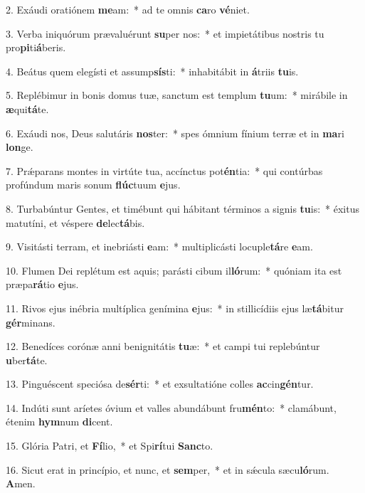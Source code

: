 2. Exáudi oratiónem \textbf{me}am:~*  ad te omnis \textbf{ca}ro \textbf{vé}niet.\

3. Verba iniquórum prævaluérunt \textbf{su}per nos:~*  et impietátibus nostris tu pro\textbf{pi}ti\textbf{á}beris.\

4. Beátus quem elegísti et assump\textbf{sís}ti:~*  inhabitábit in \textbf{á}triis \textbf{tu}is.\

5. Replébimur in bonis domus tuæ, sanctum est templum \textbf{tu}um:~*  mirábile in \textbf{æ}qui\textbf{tá}te.\

6. Exáudi nos, Deus salutáris \textbf{nos}ter:~*  spes ómnium fínium terræ et in \textbf{ma}ri \textbf{lon}ge.\

7. Prǽparans montes in virtúte tua, accínctus pot\textbf{én}tia:~*  qui contúrbas profúndum maris sonum \textbf{flúc}tuum \textbf{e}jus.\

8. Turbabúntur Gentes, et timébunt qui hábitant términos a signis \textbf{tu}is:~*  éxitus matutíni, et véspere \textbf{de}lec\textbf{tá}bis.\

9. Visitásti terram, et inebriásti \textbf{e}am:~*  multiplicásti locuple\textbf{tá}re \textbf{e}am.\

10. Flumen Dei replétum est aquis; parásti cibum il\textbf{ló}rum:~*  quóniam ita est præpa\textbf{rá}tio \textbf{e}jus.\

11. Rivos ejus inébria multíplica genímina \textbf{e}jus:~*  in stillicídiis ejus læ\textbf{tá}bitur \textbf{gér}minans.\

12. Benedíces corónæ anni benignitátis \textbf{tu}æ:~*  et campi tui replebúntur \textbf{u}ber\textbf{tá}te.\

13. Pinguéscent speciósa de\textbf{sér}ti:~*  et exsultatióne colles \textbf{ac}cin\textbf{gén}tur.\

14. Indúti sunt aríetes óvium et valles abundábunt fru\textbf{mén}to:~*  clamábunt, étenim \textbf{hym}num \textbf{di}cent.\

15. Glória Patri, et \textbf{Fí}lio,~*  et Spi\textbf{rí}tui \textbf{Sanc}to.\

16. Sicut erat in princípio, et nunc, et \textbf{sem}per,~*  et in sǽcula sæcu\textbf{ló}rum. \textbf{A}men.\

